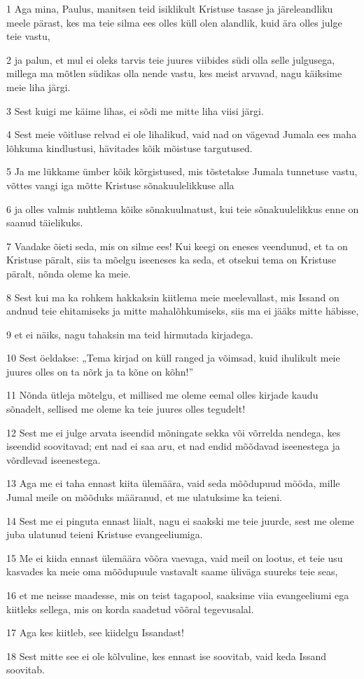 \par 1 Aga mina, Paulus, manitsen teid isiklikult Kristuse tasase ja järeleandliku meele pärast, kes ma teie silma ees olles küll olen alandlik, kuid ära olles julge teie vastu,
\par 2 ja palun, et mul ei oleks tarvis teie juures viibides südi olla selle julgusega, millega ma mõtlen südikas olla nende vastu, kes meist arvavad, nagu käiksime meie liha järgi.
\par 3 Sest kuigi me käime lihas, ei sõdi me mitte liha viisi järgi.
\par 4 Sest meie võitluse relvad ei ole lihalikud, vaid nad on vägevad Jumala ees maha lõhkuma kindlustusi, hävitades kõik mõistuse targutused.
\par 5 Ja me lükkame ümber kõik kõrgistused, mis tõstetakse Jumala tunnetuse vastu, võttes vangi iga mõtte Kristuse sõnakuulelikkuse alla
\par 6 ja olles valmis nuhtlema kõike sõnakuulmatust, kui teie sõnakuulelikkus enne on saanud täielikuks.
\par 7 Vaadake õieti seda, mis on silme ees! Kui keegi on eneses veendunud, et ta on Kristuse päralt, siis ta mõelgu iseeneses ka seda, et otsekui tema on Kristuse päralt, nõnda oleme ka meie.
\par 8 Sest kui ma ka rohkem hakkaksin kiitlema meie meelevallast, mis Issand on andnud teie ehitamiseks ja mitte mahalõhkumiseks, siis ma ei jääks mitte häbisse,
\par 9 et ei näiks, nagu tahaksin ma teid hirmutada kirjadega.
\par 10 Sest öeldakse: „Tema kirjad on küll ranged ja võimsad, kuid ihulikult meie juures olles on ta nõrk ja ta kõne on kõhn!”
\par 11 Nõnda ütleja mõtelgu, et millised me oleme eemal olles kirjade kaudu sõnadelt, sellised me oleme ka teie juures olles tegudelt!
\par 12 Sest me ei julge arvata iseendid mõningate sekka või võrrelda nendega, kes iseendid soovitavad; ent nad ei saa aru, et nad endid mõõdavad iseenestega ja võrdlevad iseenestega.
\par 13 Aga me ei taha ennast kiita ülemäära, vaid seda mõõdupuud mööda, mille Jumal meile on mõõduks määranud, et me ulatuksime ka teieni.
\par 14 Sest me ei pinguta ennast liialt, nagu ei saakski me teie juurde, sest me oleme juba ulatunud teieni Kristuse evangeeliumiga.
\par 15 Me ei kiida ennast ülemäära võõra vaevaga, vaid meil on lootus, et teie usu kasvades ka meie oma mõõdupuule vastavalt saame üliväga suureks teie seas,
\par 16 et me neisse maadesse, mis on teist tagapool, saaksime viia evangeeliumi ega kiitleks sellega, mis on korda saadetud võõral tegevusalal.
\par 17 Aga kes kiitleb, see kiidelgu Issandast!
\par 18 Sest mitte see ei ole kõlvuline, kes ennast ise soovitab, vaid keda Issand soovitab.


